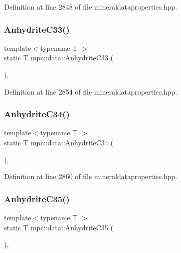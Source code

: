 Definition at line 2848 of file mineraldataproperties.\+hpp.

\mbox{\label{namespacempc_1_1data_a477d4f3edb8c03f41e7e745801dea5a5}} 
\subsubsection{\texorpdfstring{Anhydrite\+C33()}{AnhydriteC33()}}
{\footnotesize\ttfamily template$<$typename T $>$ \\
static T mpc\+::data\+::\+Anhydrite\+C33 (\begin{DoxyParamCaption}{ }\end{DoxyParamCaption})\hspace{0.3cm}{\ttfamily [inline]}, {\ttfamily [static]}}



Definition at line 2854 of file mineraldataproperties.\+hpp.

\mbox{\label{namespacempc_1_1data_a02b0c9903ce1bb4edf1ea60b3520c30c}} 
\subsubsection{\texorpdfstring{Anhydrite\+C34()}{AnhydriteC34()}}
{\footnotesize\ttfamily template$<$typename T $>$ \\
static T mpc\+::data\+::\+Anhydrite\+C34 (\begin{DoxyParamCaption}{ }\end{DoxyParamCaption})\hspace{0.3cm}{\ttfamily [inline]}, {\ttfamily [static]}}



Definition at line 2860 of file mineraldataproperties.\+hpp.

\mbox{\label{namespacempc_1_1data_a94b371e4bcbd81ed88e9817c8d0241c1}} 
\subsubsection{\texorpdfstring{Anhydrite\+C35()}{AnhydriteC35()}}
{\footnotesize\ttfamily template$<$typename T $>$ \\
static T mpc\+::data\+::\+Anhydrite\+C35 (\begin{DoxyParamCaption}{ }\end{DoxyParamCaption})\hspace{0.3cm}{\ttfamily [inline]}, {\ttfamily [static]}}



